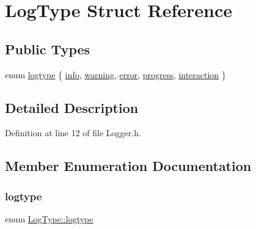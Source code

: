 \hypertarget{struct_log_type}{}\section{Log\+Type Struct Reference}
\label{struct_log_type}
\subsection*{Public Types}
\begin{DoxyCompactItemize}
\item 
enum \hyperlink{struct_log_type_a42f5153a559d41c697e4763ed36ff217}{logtype} \{ \newline
\hyperlink{struct_log_type_a42f5153a559d41c697e4763ed36ff217af6cbcad76cc2c860c206cefe43716a6b}{info}, 
\hyperlink{struct_log_type_a42f5153a559d41c697e4763ed36ff217af479132e55c523158544cc5c059bc9be}{warning}, 
\hyperlink{struct_log_type_a42f5153a559d41c697e4763ed36ff217af7be1f9d57d8054ac42608401faebff7}{error}, 
\hyperlink{struct_log_type_a42f5153a559d41c697e4763ed36ff217aaf0ab04c6e780051a63639d0df57eb20}{progress}, 
\newline
\hyperlink{struct_log_type_a42f5153a559d41c697e4763ed36ff217a53f06005557a25a49c105c26c34e8a6c}{interaction}
 \}
\end{DoxyCompactItemize}


\subsection{Detailed Description}


Definition at line 12 of file Logger.\+h.



\subsection{Member Enumeration Documentation}
\mbox{\label{struct_log_type_a42f5153a559d41c697e4763ed36ff217}} 
\subsubsection{\texorpdfstring{logtype}{logtype}}
{\footnotesize\ttfamily enum \hyperlink{struct_log_type_a42f5153a559d41c697e4763ed36ff217}{Log\+Type\+::logtype}}

